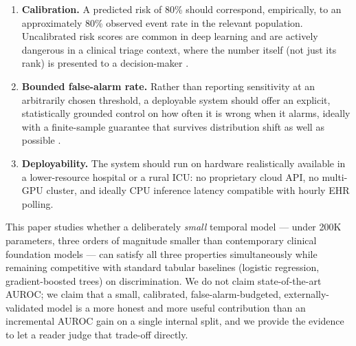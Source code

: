 \documentclass[11pt]{article}
\begin{document}
\begin{enumerate}[leftmargin=*]
    \item \textbf{Calibration.} A predicted risk of 80\% should correspond, empirically, to an approximately 80\% observed event rate in the relevant population. Uncalibrated risk scores are common in deep learning \citep{guo2017calibration} and are actively dangerous in a clinical triage context, where the number itself (not just its rank) is presented to a decision-maker \citep{vancalster2019calibration}.
    \item \textbf{Bounded false-alarm rate.} Rather than reporting sensitivity at an arbitrarily chosen threshold, a deployable system should offer an explicit, statistically grounded control on how often it is wrong when it alarms, ideally with a finite-sample guarantee that survives distribution shift as well as possible \citep{angelopoulos2022conformal, vovk2005algorithmic}.
    \item \textbf{Deployability.} The system should run on hardware realistically available in a lower-resource hospital or a rural ICU: no proprietary cloud API, no multi-GPU cluster, and ideally CPU inference latency compatible with hourly EHR polling.
\end{enumerate}

This paper studies whether a deliberately \emph{small} temporal model --- under 200K parameters, three orders of magnitude smaller than contemporary clinical foundation models --- can satisfy all three properties simultaneously while remaining competitive with standard tabular baselines (logistic regression, gradient-boosted trees) on discrimination. We do not claim state-of-the-art AUROC; we claim that a small, calibrated, false-alarm-budgeted, externally-validated model is a more honest and more useful contribution than an incremental AUROC gain on a single internal split, and we provide the evidence to let a reader judge that trade-off directly.
\end{document}

